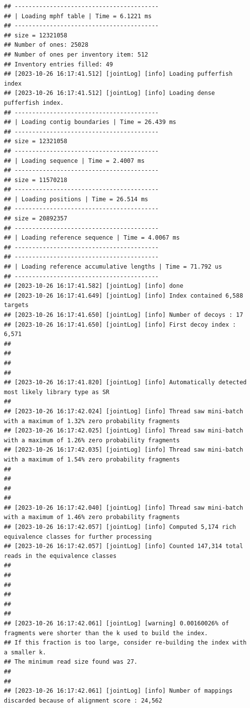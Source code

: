 \documentclass[
]{book}
\begin{document}
\begin{verbatim}
## -----------------------------------------
## | Loading mphf table | Time = 6.1221 ms
## -----------------------------------------
## size = 12321058
## Number of ones: 25028
## Number of ones per inventory item: 512
## Inventory entries filled: 49
## [2023-10-26 16:17:41.512] [jointLog] [info] Loading pufferfish index
## [2023-10-26 16:17:41.512] [jointLog] [info] Loading dense pufferfish index.
## -----------------------------------------
## | Loading contig boundaries | Time = 26.439 ms
## -----------------------------------------
## size = 12321058
## -----------------------------------------
## | Loading sequence | Time = 2.4007 ms
## -----------------------------------------
## size = 11570218
## -----------------------------------------
## | Loading positions | Time = 26.514 ms
## -----------------------------------------
## size = 20892357
## -----------------------------------------
## | Loading reference sequence | Time = 4.0067 ms
## -----------------------------------------
## -----------------------------------------
## | Loading reference accumulative lengths | Time = 71.792 us
## -----------------------------------------
## [2023-10-26 16:17:41.582] [jointLog] [info] done
## [2023-10-26 16:17:41.649] [jointLog] [info] Index contained 6,588 targets
## [2023-10-26 16:17:41.650] [jointLog] [info] Number of decoys : 17
## [2023-10-26 16:17:41.650] [jointLog] [info] First decoy index : 6,571 
## 
## 
## 
## 
## [2023-10-26 16:17:41.820] [jointLog] [info] Automatically detected most likely library type as SR
## 
## [2023-10-26 16:17:42.024] [jointLog] [info] Thread saw mini-batch with a maximum of 1.32% zero probability fragments
## [2023-10-26 16:17:42.025] [jointLog] [info] Thread saw mini-batch with a maximum of 1.26% zero probability fragments
## [2023-10-26 16:17:42.035] [jointLog] [info] Thread saw mini-batch with a maximum of 1.54% zero probability fragments
## 
## 
## 
## 
## [2023-10-26 16:17:42.040] [jointLog] [info] Thread saw mini-batch with a maximum of 1.46% zero probability fragments
## [2023-10-26 16:17:42.057] [jointLog] [info] Computed 5,174 rich equivalence classes for further processing
## [2023-10-26 16:17:42.057] [jointLog] [info] Counted 147,314 total reads in the equivalence classes 
## 
## 
## 
## 
## 
## 
## [2023-10-26 16:17:42.061] [jointLog] [warning] 0.00160026% of fragments were shorter than the k used to build the index.
## If this fraction is too large, consider re-building the index with a smaller k.
## The minimum read size found was 27.
## 
## 
## [2023-10-26 16:17:42.061] [jointLog] [info] Number of mappings discarded because of alignment score : 24,562

\end{verbatim}
\end{document}
